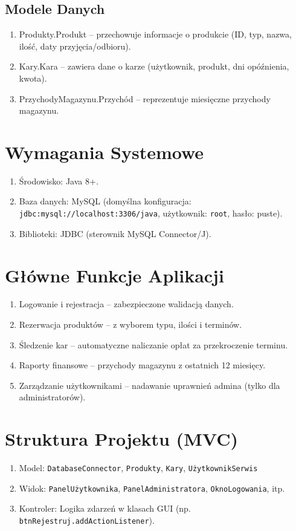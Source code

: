 \subsection{Modele Danych}
\label{subsec:modele-danych}
\begin{enumerate}
    \item Produkty.Produkt – przechowuje informacje o produkcie (ID, typ, nazwa, ilość, daty przyjęcia/odbioru).
    \item Kary.Kara – zawiera dane o karze (użytkownik, produkt, dni opóźnienia, kwota).
    \item PrzychodyMagazynu.Przychód – reprezentuje miesięczne przychody magazynu.
\end{enumerate}

\section{Wymagania Systemowe}
\label{sec:wymagania-systemowe}
\begin{enumerate}
    \item Środowisko: Java 8+.
    \item Baza danych: MySQL (domyślna konfiguracja: \texttt{jdbc:mysql://localhost:3306/java}, użytkownik: \texttt{root}, hasło: puste).
    \item Biblioteki: JDBC (sterownik MySQL Connector/J).
\end{enumerate}

\section{Główne Funkcje Aplikacji}
\label{sec:glowne-funkcje}
\begin{enumerate}
    \item Logowanie i rejestracja – zabezpieczone walidacją danych.
    \item Rezerwacja produktów – z wyborem typu, ilości i terminów.
    \item Śledzenie kar – automatyczne naliczanie opłat za przekroczenie terminu.
    \item Raporty finansowe – przychody magazynu z ostatnich 12 miesięcy.
    \item Zarządzanie użytkownikami – nadawanie uprawnień admina (tylko dla administratorów).
\end{enumerate}

\section{Struktura Projektu (MVC)}
\label{sec:struktura-mvc}
\begin{enumerate}
    \item Model: \texttt{DatabaseConnector}, \texttt{Produkty}, \texttt{Kary}, \texttt{UżytkownikSerwis}
    \item Widok: \texttt{PanelUżytkownika}, \texttt{PanelAdministratora}, \texttt{OknoLogowania}, itp.
    \item Kontroler: Logika zdarzeń w klasach GUI (np. \texttt{btnRejestruj.addActionListener}).
\end{enumerate}